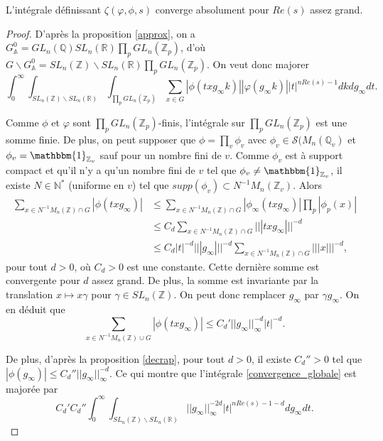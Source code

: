 \begin{lemme}
\label{lemme_convergence_globale}
L'intégrale définissant $\zeta(\varphi, \phi, s)$ converge absolument pour $Re(s)$ assez grand.
\end{lemme}

\begin{proof}
D'après la proposition \ref{approx}, on a $G^0_\mathbb{A} = GL_n(\mathbb{Q})SL_n(\mathbb{R})\prod_p GL_n(\mathbb{Z}_p)$, d'où $G \backslash G^0_\mathbb{A} = SL_n(\mathbb{Z}) \backslash SL_n(\mathbb{R}) \prod_p GL_n(\mathbb{Z}_p)$. On veut donc majorer
\begin{equation}
\label{convergence_globale}
\int_0^\infty \int_{SL_n(\mathbb{Z}) \backslash SL_n(\mathbb{R})} \int_{\prod_p GL_n(\mathbb{Z}_p)} \sum_{x \in G}{|\phi(txg_\infty k)|} |\varphi(g_\infty k)| |t|^{nRe(s)-1} dk dg_\infty dt.
\end{equation}

Comme $\phi$ et $\varphi$ sont $\prod_p GL_n(\mathbb{Z}_p)$-finis, l'intégrale sur $\prod_p GL_n(\mathbb{Z}_p)$ est une somme finie. De plus, on peut supposer que $\phi = \prod_v \phi_v$ avec $\phi_v \in \mathcal{S}(M_n(\mathbb{Q}_v)$ et $\phi_v = \mathbbm{1}_{\mathbb{Z}_v}$ sauf pour un nombre fini de $v$. Comme $\phi_v$ est à support compact et qu'il n'y a qu'un nombre fini de $v$ tel que $\phi_v \neq \mathbbm{1}_{\mathbb{Z}_v}$, il existe $N \in \mathbb{N}^*$ (uniforme en $v$) tel que $supp(\phi_v) \subset N^{-1}M_n(\mathbb{Z}_v)$. Alors
\begin{align}
\sum_{x \in N^{-1}M_n(\mathbb{Z}) \cap G} |\phi(txg_\infty)| &\leq \sum_{x \in N^{-1}M_n(\mathbb{Z}) \cap G} |\phi_\infty(txg_\infty)|\prod_p |\phi_p(x)| \\
&\leq C_d \sum_{x \in N^{-1}M_n(\mathbb{Z}) \cap G} |||txg_\infty|||^{-d} \\
&\leq C_d |t|^{-d}|||g_\infty|||^{-d}\sum_{x \in N^{-1}M_n(\mathbb{Z}) \cap G} |||x|||^{-d},
\end{align}
pour tout $d > 0$, où $C_d > 0$ est une constante. Cette dernière somme est convergente pour $d$ assez grand. De plus, la somme est invariante par la translation $x \mapsto x\gamma$ pour $\gamma \in SL_n(\mathbb{Z})$. On peut donc remplacer $g_\infty$ par $\gamma g_\infty$. On en déduit que
\begin{equation}
\sum_{x \in N^{-1}M_n(\mathbb{Z}) \cup G} |\phi(txg_\infty)| \leq C_d' ||g_\infty ||^{-d}_{\infty} |t|^{-d}.
\end{equation}

De plus, d'après la proposition \ref{decrap}, pour tout $d > 0$, il existe $C_d'' > 0$ tel que $|\phi(g_\infty)| \leq C_d'' ||g_\infty||^{-d}_\infty$. Ce qui montre que l'intégrale \ref{convergence_globale} est majorée par
\begin{equation}
C_d'C_d''\int_0^\infty \int_{SL_n(\mathbb{Z}) \backslash SL_n(\mathbb{R})} ||g_\infty||^{-2d}_\infty|t|^{nRe(s)-1-d} dg_\infty dt.
\end{equation}


\end{proof}
